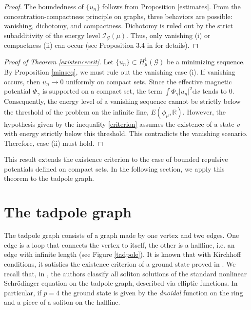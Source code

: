\documentclass[12pt,a4paper]{amsart}
\theoremstyle{definition}
\theoremstyle{plain}
\numberwithin{equation}{section}
\begin{document}
\begin{proof}
The boundedness of $\{u_n\}$ follows from Proposition \ref{estimates}. From the concentration-compactness principle on graphs, three behaviors are possible: vanishing, dichotomy, and compactness. Dichotomy is ruled out by the strict subadditivity of the energy level $\mathcal{I}_\mathcal{G}(\mu)$. Thus, only vanishing (i) or compactness (ii) can occur (see Proposition 3.4 in \cite{Adami2025} for details).
\end{proof}

\begin{proof}[Proof of Theorem \ref{existencecrit}]
Let $\{ u_n \} \subset H^1_{\mu}(\mathcal{G})$ be a minimizing sequence. By Proposition \ref{minseq}, we must rule out the vanishing case (i). 
If vanishing occurs, then $u_n \rightarrow 0$ uniformly on compact sets. Since the effective magnetic potential $\Phi_\gamma$ is supported on a compact set, the term $\int \Phi_\gamma |u_n|^2 \mathrm{d}x$ tends to 0. Consequently, the energy level of a vanishing sequence cannot be strictly below the threshold of the problem on the infinite line, $E(\phi_\mu, \mathbb{R})$.
However, the hypothesis given by the inequality \eqref{criterion} assumes the existence of a state $v$ with energy strictly below this threshold. This contradicts the vanishing scenario. Therefore, case (ii) must hold.
\end{proof}

This result extends the existence criterion to the case of bounded repulsive potentials defined on compact sets. In the following section, we apply this theorem to the tadpole graph.


\section{The tadpole graph}
\label{Sec6}


The tadpole graph consists of a graph made by one vertex and two edges. One edge is a loop that connects the vertex to itself, the other is a halfline, i.e. an edge with infinite length (see Figure \ref{tadpole}). 
It is known that with Kirchhoff conditions, it satisfies the existence criterion of a ground state proved in \cite{Adami2016}.
We recall that, in \cite{NCF15, NPS2015}, the authors classify all soliton solutions of the standard nonlinear Schrödinger equation on the tadpole graph, described via elliptic functions. In particular, if $p=4$ the ground state is given by the \textit{dnoidal} function on the ring and a piece of a soliton on the halfline. 
\end{document}
